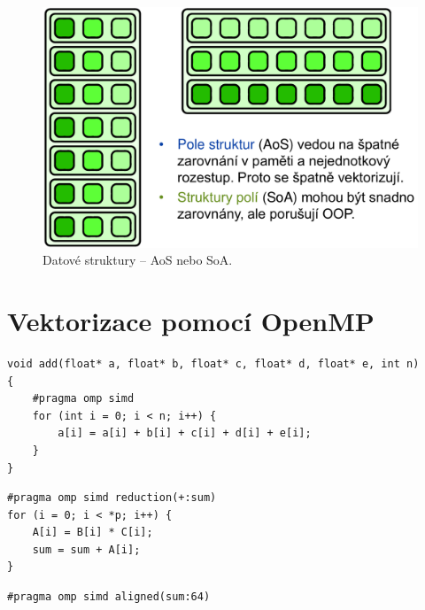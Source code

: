 \begin{compactitem}
    \begin{figure}[H]
        \centering
        \includegraphics[width=0.85\linewidth]{datove_struktury.pdf}
        \caption{Datové struktury -- AoS nebo SoA.}
    \end{figure}
\end{compactitem}


\section{Vektorizace pomocí OpenMP}

\noindent\begin{minipage}{\linewidth}
\begin{lstlisting}[language=c_language, caption={Obyčejná smyčka.}]
void add(float* a, float* b, float* c, float* d, float* e, int n)
{
    #pragma omp simd
    for (int i = 0; i < n; i++) {
        a[i] = a[i] + b[i] + c[i] + d[i] + e[i];
    }
}
\end{lstlisting}
\end{minipage}

\noindent\begin{minipage}{\linewidth}
\begin{lstlisting}[language=c_language, caption={Redukce, po skončení vektorovýho výpočtu posčítá mezivýsledky.}]
#pragma omp simd reduction(+:sum)
for (i = 0; i < *p; i++) {
    A[i] = B[i] * C[i];
    sum = sum + A[i];
}
\end{lstlisting}
\end{minipage}

\noindent\begin{minipage}{\linewidth}
\begin{lstlisting}[language=c_language, caption={Aligned, dané proměnné jsou zarovnány na počet bytů.}]
#pragma omp simd aligned(sum:64)

\end{lstlisting}
\end{minipage}

